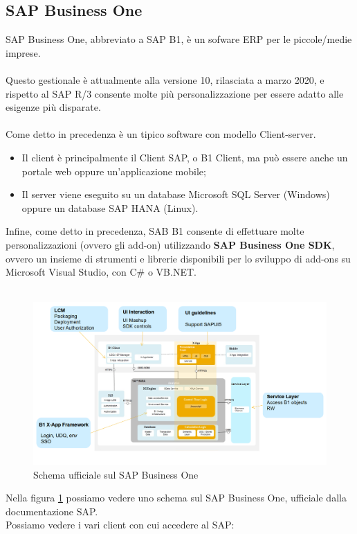 \subsection{SAP Business One}
SAP Business One, abbreviato a SAP B1, è un sofware ERP per le piccole/medie imprese.
\\\\Questo gestionale è attualmente alla versione 10, rilasciata a marzo 2020, e rispetto al SAP R/3 consente molte più personalizzazione per essere adatto alle esigenze più disparate.
\\\\Come detto in precedenza è un tipico software con modello Client-server.
\begin{itemize}
	\item Il client è principalmente il Client SAP, o B1 Client, ma può essere anche un portale web oppure un'applicazione mobile;
	\item Il server viene eseguito su un database Microsoft SQL Server (Windows) oppure un database SAP HANA (Linux).\\
\end{itemize}
Infine, come detto in precedenza, SAB B1 consente di effettuare molte personalizzazioni (ovvero gli add-on) utilizzando \textbf{SAP Business One SDK}, ovvero un insieme di strumenti e librerie disponibili per lo sviluppo di add-ons su Microsoft Visual Studio, con C\# o VB.NET.\\\\
\begin{figure}[!h] 
	\includegraphics[scale = 0.4, left]{immagini/erp-sap-inside.png} 
	\caption{Schema ufficiale sul SAP Business One}
	\label{fig:2-3}
\end{figure}
\newpage
\begin{flushleft}
	Nella figura \ref{fig:2-3} possiamo vedere uno schema sul SAP Business One, ufficiale dalla documentazione SAP.\\
	Possiamo vedere i vari client con cui accedere al SAP:
\end{flushleft}


